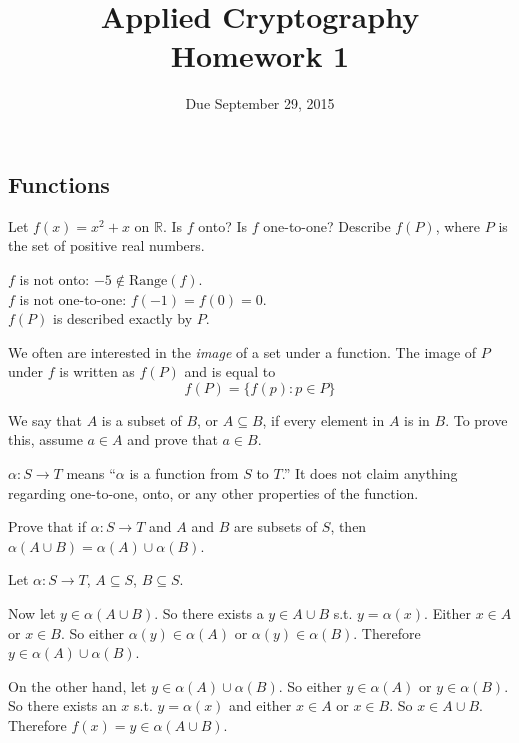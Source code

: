\documentclass{exam}
\title{Applied Cryptography\\Homework 1}
\date{Due September 29, 2015}
\newcommand{\R}{\mathbb{R}}
\newcommand{\?}{\stackrel{?}{=}}
\begin{document}
\maketitle
\printanswers


\begin{questions}

	\section*{Functions}

	\question 
	Let $f(x) = x^2 + x$ on $\R$. Is $f$ onto? Is $f$ one-to-one? Describe $f(P)$, where $P$ is the set of positive real numbers.
	\begin{solution}
		$f$ is not onto: $-5 \not\in \mathrm{Range}(f)$. \\
		$f$ is not one-to-one: $f(-1) = f(0) = 0$. \\
		$f(P)$ is described exactly by $P$.
	\end{solution}
	
	\begin{mdframed}
		We often are interested in the \textit{image} of a set under a function.
		The image of $P$ under $f$ is written as $f(P)$ and is equal to
		\[ f(P) = \{f(p) : p \in P\} \]
		
		We say that $A$ is a subset of $B$, or $A \subseteq B$, if every element in
		$A$ is in $B$. To prove this, assume $a \in A$ and prove that $a \in B$.

		$\alpha: S \rightarrow T$ means ``$\alpha$ is a function from $S$ to
		$T$.'' It
		does not claim anything regarding one-to-one, onto, or any other properties
		of the function.

	\end{mdframed}

	\question 
	Prove that if $\alpha: S \rightarrow T$ and $A$ and $B$ are subsets of $S$, then $\alpha(A \cup B) = \alpha(A) \cup \alpha(B)$.
	\begin{solution}
		Let $\alpha: S \rightarrow T$, $A \subseteq S$, $B \subseteq S$.

		Now let $y \in \alpha(A \cup B)$. So there exists a $y \in A \cup B$ s.t. $y = \alpha(x)$. Either $x \in A$ or $x \in B$. So either $\alpha(y) \in \alpha(A)$ or $\alpha(y) \in \alpha(B)$. Therefore $y \in \alpha(A) \cup \alpha(B)$.

		On the other hand, let $y \in \alpha(A) \cup \alpha(B)$. So either $y \in \alpha(A)$ or $y \in \alpha(B)$. So there exists an $x$ s.t. $y = \alpha(x)$ and either $x \in A$ or $x \in B$. So $x \in A \cup B$. Therefore $f(x) = y \in \alpha(A \cup B)$.
	\end{solution}


\end{questions}
\end{document}
